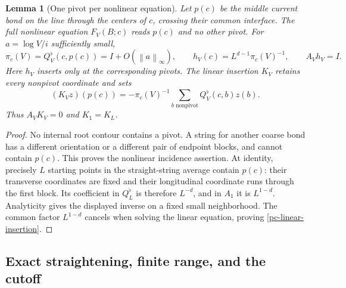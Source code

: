 \documentclass[11pt]{article}
\newtheorem{lemma}[theorem]{Lemma}
\newcommand{\norm}[1]{\left\|#1\right\|}
\begin{document}
\begin{lemma}[One pivot per nonlinear equation]\label{pc-pivot-lemma}
Let $p(c)$ be the middle current bond on the line through the
centers of $c$, crossing their common interface. The full
nonlinear equation $F_V(B;c)$ reads $p(c)$ and no other pivot.
For $a=\log V/i$ sufficiently small,
\begin{equation}\label{pc-pivot-inverse}
 \pi_c(V)=Q_V^\flat(c,p(c))=I+O(\norm a_\infty),\qquad
 h_V(c)=L^{d-1}\pi_c(V)^{-1},\qquad A_Vh_V=I.
\end{equation}
Here $h_V$ inserts only at the corresponding pivots. The linear
insertion $K_V$ retains every nonpivot coordinate and sets
\begin{equation}\label{pc-linear-insertion}
 (K_Vz)(p(c))=-\pi_c(V)^{-1}
       \sum_{b\text{ nonpivot}}Q_V^\flat(c,b)z(b).
\end{equation}
Thus $A_VK_V=0$ and $K_1=K_L$.
\end{lemma}

\begin{proof}
No internal root contour contains a pivot. A string for another
coarse bond has a different orientation or a different pair of
endpoint blocks, and cannot contain $p(c)$. This proves the
nonlinear incidence assertion. At identity, precisely $L$
starting points in the straight-string average contain $p(c)$:
their transverse coordinates are fixed and their longitudinal
coordinate runs through the first block. Its coefficient in
$Q_L^\flat$ is therefore $L^{-d}$, and in $A_1$ it is
$L^{1-d}$. Analyticity gives the displayed inverse on a fixed
small neighborhood. The common factor $L^{1-d}$ cancels when
solving the linear equation, proving
\eqref{pc-linear-insertion}.
\end{proof}

\subsection{Exact straightening, finite range, and the cutoff}
\label{pc-chart-section}
\end{document}

